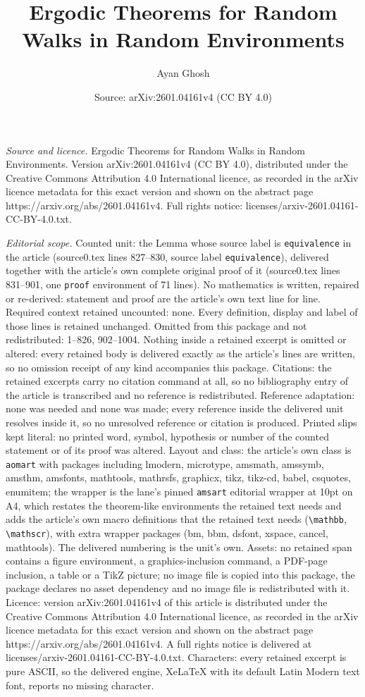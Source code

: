 \documentclass[10pt,a4paper]{amsart}
\title[Ergodic Theorems for Random Walks in Random Environments]{Ergodic Theorems for Random Walks in Random Environments}
\author{Ayan Ghosh}
\date{Source: arXiv:2601.04161v4 (CC BY 4.0)}
\begin{document}
\maketitle

\noindent\emph{Source and licence.} Ergodic Theorems for Random Walks in Random Environments. Version arXiv:2601.04161v4 (CC BY 4.0), distributed under the Creative Commons Attribution 4.0 International licence, as recorded in the arXiv licence metadata for this exact version and shown on the abstract page https://arxiv.org/abs/2601.04161v4. Full rights notice: licenses/arxiv-2601.04161-CC-BY-4.0.txt.\par\smallskip

\noindent\textit{Editorial scope.} Counted unit: the Lemma whose source label is \texttt{equivalence} in the article (source0.tex lines 827--830, source label \texttt{equivalence}), delivered together with the article's own complete original proof of it (source0.tex lines 831--901, one \texttt{proof} environment of 71 lines). No mathematics is written, repaired or re-derived: statement and proof are the article's own text line for line. Required context retained uncounted: none. Every definition, display and label of those lines is retained unchanged. Omitted from this package and not redistributed: 1--826, 902--1004. Nothing inside a retained excerpt is omitted or altered: every retained body is delivered exactly as the article's lines are written, so no omission receipt of any kind accompanies this package. Citations: the retained excerpts carry no citation command at all, so no bibliography entry of the article is transcribed and no reference is redistributed. Reference adaptation: none was needed and none was made; every reference inside the delivered unit resolves inside it, so no unresolved reference or citation is produced. Printed slips kept literal: no printed word, symbol, hypothesis or number of the counted statement or of its proof was altered. Layout and class: the article's own class is \texttt{aomart} with packages including lmodern, microtype, amsmath, amssymb, amsthm, amsfonts, mathtools, mathrsfs, graphicx, tikz, tikz-cd, babel, csquotes, enumitem; the wrapper is the lane's pinned \texttt{amsart} editorial wrapper at 10pt on A4, which restates the theorem-like environments the retained text needs and adds the article's own macro definitions that the retained text needs (\texttt{\textbackslash mathbb}, \texttt{\textbackslash mathscr}), with extra wrapper packages (bm, bbm, dsfont, xspace, cancel, mathtools). The delivered numbering is the unit's own. Assets: no retained span contains a figure environment, a graphics-inclusion command, a PDF-page inclusion, a table or a TikZ picture; no image file is copied into this package, the package declares no asset dependency and no image file is redistributed with it. Licence: version arXiv:2601.04161v4 of this article is distributed under the Creative Commons Attribution 4.0 International licence, as recorded in the arXiv licence metadata for this exact version and shown on the abstract page https://arxiv.org/abs/2601.04161v4. A full rights notice is delivered at licenses/arxiv-2601.04161-CC-BY-4.0.txt. Characters: every retained excerpt is pure ASCII, so the delivered engine, XeLaTeX with its default Latin Modern text font, reports no missing character.
\end{document}
